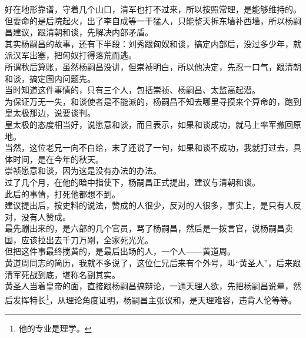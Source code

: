 \begin{multicols}{\theparacolNo}
好在地形靠谱，守着几个山口，清军也打不过来，所以按照常理，是能够维持的。\\

但要命的是后院起火，出了李自成等一干猛人，只能整天拆东墙补西墙，所以杨嗣昌建议，跟清朝和谈，先解决内部矛盾。\\

其实杨嗣昌的故事，还有下半段：刘秀跟匈奴和谈，搞定内部后，没过多少年，就派汉军出塞，把匈奴打得落荒而逃。\\

所谓秋后算账，虽然杨嗣昌没讲，但崇祯明白，所以他决定，先忍一口气，跟清朝和谈，搞定国内问题先。\\

当时知道这件事情的，只有三个人，包括崇祯、杨嗣昌、太监高起潜。\\

为保证万无一失，和谈使者是不能派的，杨嗣昌不知去哪里寻摸来个算命的，跑到皇太极那边，说要谈判。\\

皇太极的态度相当好，说愿意和谈，而且表示，如果和谈成功，就马上率军撤回原地。\\

当然，这位老兄一向不白给，末了还说了一句，如果和谈不成功，我就打过去，具体时间，是在今年的秋天。\\

崇祯愿意和谈，因为这是没有办法的办法。\\

过了几个月，在他的暗中指使下，杨嗣昌正式提出，建议与清朝和谈。\\

此后的事情，打死他都想不到。\\

建议提出后，按史料的说法，赞成的人很少，反对的人很多，事实上，是只有人反对，没有人赞成。\\

最先蹦出来的，是六部的几个官员，骂了杨嗣昌，然后是一拨言官，说杨嗣昌卖国，应该拉出去千刀万剐，全家死光光。\\

但把这件事最终搅黄的，是最后出场的人，一个人——黄道周。\\

黄道周同志的简历，我就不多说了，这位仁兄后来有个外号，叫“黄圣人”，后来跟清军死战到底，堪称名副其实。\\

黄圣人当着皇帝的面，直接跟杨嗣昌搞辩论，一通天理人欲，先把杨嗣昌说晕，然后发挥特长\footnote{他的专业是理学。}，从理论角度证明，杨嗣昌主张议和，是天理难容，违背人伦等等。\\


\end{multicols}
